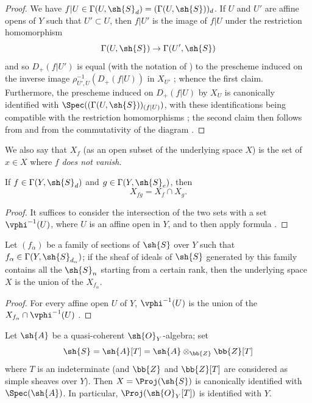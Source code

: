 \begin{proof}
We have $f|U\in\Gamma(U,\sh{S}_d)=(\Gamma(U,\sh{S}))_d$.
If $U$ and $U'$ are affine opens of $Y$ such that $U'\subset U$, then $f|U'$ is the image of $f|U$ under the restriction homomorphism
\[
  \Gamma(U,\sh{S}) \to \Gamma(U',\sh{S})
\]
and so $D_+(f|U')$ is equal (with the notation of ) to the prescheme induced on the inverse image $\rho_{U',U}^{-1}(D_+(f|U))$ in $X_{U'}$ ;
whence the first claim.
Furthermore, the prescheme induced on $D_+(f|U)$ by $X_U$ is canonically identified with $\Spec((\Gamma(U,\sh{S}))_{(f|U)})$, with these identifications being compatible with the restriction homomorphisms ;
the second claim then follows from  and from the commutativity of the diagram .
\end{proof}

We also say that $X_f$ (as an open subset of the underlying space $X$) is the set of $x\in X$ where $f$ \emph{does not vanish}.

\begin{corollary}[3.1.5]
\label{II.3.1.5}
If $f\in\Gamma(Y,\sh{S}_d)$ and $g\in\Gamma(Y,\sh{S}_e)$, then
\[
\label{II.3.1.5.1}
  X_{fg} = X_f\cap X_g.
\tag{3.1.5.1}
\]
\end{corollary}

\begin{proof}
It suffices to consider the intersection of the two sets with a set $\vphi^{-1}(U)$, where $U$ is an affine open in $Y$, and to then apply formula .
\end{proof}

\begin{corollary}[3.1.6]
\label{II.3.1.6}
Let $(f_\alpha)$ be a family of sections of $\sh{S}$ over $Y$ such that $f_\alpha\in\Gamma(Y,\sh{S}_{d_\alpha})$;
if the sheaf of ideals of $\sh{S}$ generated by this family  contains all the $\sh{S}_n$ starting from a certain rank, then the underlying space $X$ is the union of the $X_{f_\alpha}$.
\end{corollary}

\begin{proof}
For every affine open $U$ of $Y$, $\vphi^{-1}(U)$ is the union of the $X_{f_\alpha}\cap\vphi^{-1}(U)$ .
\end{proof}

\begin{corollary}[3.1.7]
\label{II.3.1.7}
Let $\sh{A}$ be a quasi-coherent $\sh{O}_Y$-algebra;
set
\[
  \sh{S} = \sh{A}[T] = \sh{A}\otimes_{\bb{Z}}\bb{Z}[T]
\]
where $T$ is an indeterminate (and $\bb{Z}$ and $\bb{Z}[T]$ are considered as simple sheaves over $Y$).
Then $X=\Proj(\sh{S})$ is canonically identified with $\Spec(\sh{A})$.
In particular, $\Proj(\sh{O}_Y[T])$ is identified with $Y$.
\end{corollary}

